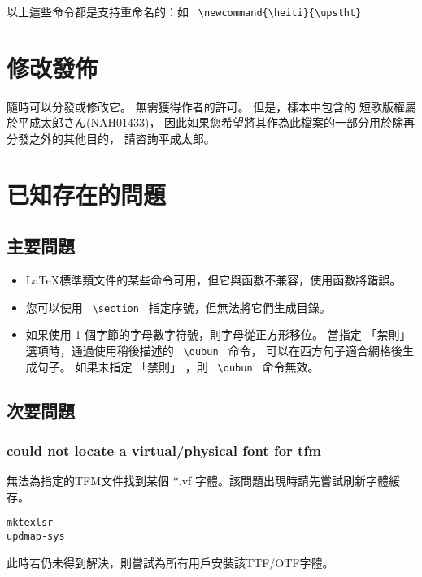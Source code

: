 \documentclass[a4,11pt,uplatex,openleft]{jsarticle}
\DeclareRobustCommand\upstht{\kanjifamily{upstht}\selectfont}
\begin{document}
以上這些命令都是支持重命名的：如 \verb+ \newcommand{\heiti}{\upstht} +




\section{修改\quad 發佈}
隨時可以分發或修改它。 無需獲得作者的許可。
但是，樣本中包含的 短歌版權屬於平成太郎さん(NAH01433)，
因此如果您希望將其作為此檔案的一部分用於除再分發之外的其他目的，
請咨詢平成太郎。

\section{已知存在的問題}

\subsection{主要問題}
\begin{itemize}
\item \LaTeX 標準類文件的某些命令可用，但它與函數不兼容，使用函數將錯誤。
\item 您可以使用 \verb+ \section + 指定序號，但無法將它們生成目錄。
\item 如果使用 1 個字節的字母數字符號，則字母從正方形移位。
當指定 「禁則」 選項時，通過使用稍後描述的 \verb+ \oubun + 命令，
可以在西方句子適合網格後生成句子。
如果未指定 「禁則」 ，則 \verb+ \oubun + 命令無效。
\end{itemize}


\subsection{次要問題}

\subsubsection{could not locate a virtual/physical font for tfm} \label{TFM}
\par 無法為指定的TFM文件找到某個 *.vf 字體。該問題出現時請先嘗試刷新字體緩存。
\begin{lstlisting}
mktexlsr
updmap-sys
\end{lstlisting}

\par 此時若仍未得到解決，則嘗試為所有用戶安裝該TTF/OTF字體。
\end{document}
